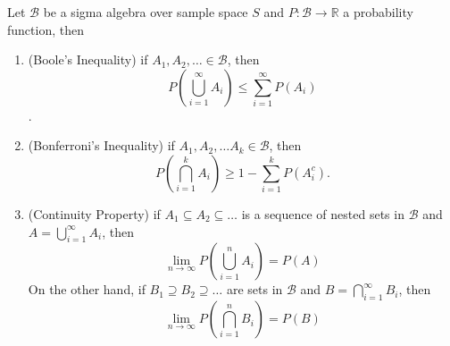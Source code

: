 \documentclass[11pt,fleqn]{book} %
\begin{document}
\begin{proposition} 
Let \(\mathcal{B}\) be a sigma algebra over sample space \(S\) and \(P:\mathcal{B}\rightarrow\mathbb{R}\) a probability function, then
\begin{enumerate}
\item (Boole's Inequality) if \(A_1, A_2, \ldots \in \mathcal{B}\), then 
\[
P\left(\bigcup_{i=1}^\infty A_i\right) \leq \sum_{i=1}^\infty P(A_i)
\].
\item (Bonferroni's Inequality) if \(A_1, A_2, \ldots A_k \in \mathcal{B}\), then
\[
P\left(\bigcap_{i=1}^k A_i\right) \geq 1 - \sum_{i=1}^k P(A_i^c).
\]
\item (Continuity Property) if \(A_1\subseteq A_2 \subseteq \ldots\) is a sequence of nested sets in \(\mathcal{B}\) and \(A = \bigcup_{i=1}^\infty A_i\), then
\[
\lim_{n\rightarrow\infty} P\left(\bigcup_{i=1}^nA_i\right) = P(A)
\]
On the other hand, if \(B_1 \supseteq B_2 \supseteq \ldots\) are sets in \(\mathcal{B}\) and \(B = \bigcap_{i=1}^\infty B_i\), then
\[
\lim_{n\rightarrow\infty}P\left(\bigcap_{i=1}^n B_i\right) = P(B)
\]
\end{enumerate}
\end{proposition}
\end{document}
